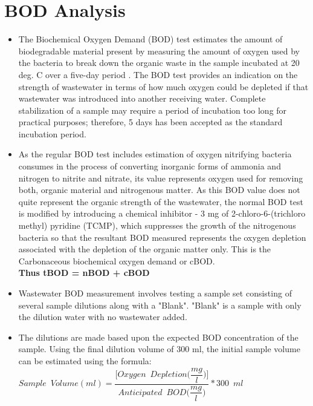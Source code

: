 		\section{BOD Analysis}		
\begin{itemize}
\setlength\itemsep{1em}

\item The Biochemical Oxygen Demand (BOD) test estimates the amount of biodegradable material present by measuring the amount of oxygen used by the bacteria to break down the organic waste in the sample incubated at 20 deg. C over a five-day period . The BOD test provides an indication on the strength of wastewater in terms of how much oxygen could be depleted if that wastewater was introduced into another receiving water.  Complete stabilization of a sample may require a period of incubation too long for practical purposes; therefore, 5 days has been accepted as the standard incubation period.

\item As the regular BOD test includes estimation of oxygen nitrifying bacteria consumes in the process of converting inorganic forms of ammonia and nitrogen to nitrite and nitrate, its value represents oxygen used for removing both, organic material and nitrogenous matter.  As this BOD value does not quite represent the organic strength of the wastewater, the normal BOD test is modified by introducing a chemical inhibitor - 3 mg of 2-chloro-6-(trichloro methyl) pyridine (TCMP), which suppresses the growth of the nitrogenous bacteria so that the resultant BOD measured represents the oxygen depletion associated with the depletion of the organic matter only.  This is the Carbonaceous biochemical oxygen demand or cBOD. \\
\vspace{0.4cm}
\textbf{Thus tBOD = nBOD + cBOD}

\item Wastewater BOD measurement involves testing a sample set consisting of several sample dilutions along with a "Blank".  "Blank" is a sample with only the dilution water with no wastewater added. \\


\item The dilutions are made based upon the expected BOD concentration of the sample.  Using the final dilution volume of 300 ml, the initial sample volume can be estimated using the formula:\\

\textbf{$Sample \enspace Volume (ml) = \dfrac{\Big[Oxygen \enspace Depletion \Big(\dfrac{mg}{l}\Big)\Big]}{Anticipated \enspace BOD \Big(\dfrac{mg}{l}\Big)}*300 \enspace ml$}\\


\end{itemize}
